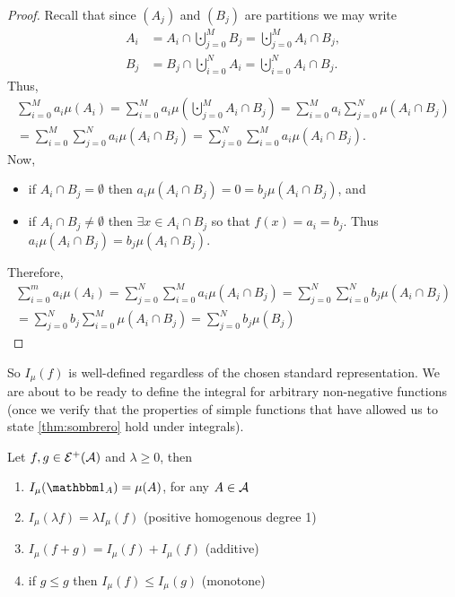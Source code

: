 \begin{proof}
	Recall that since $(A_j)$ and $(B_j)$ are partitions we may write
	\begin{align*}
		A_i &= A_i \cap \bigcupdot_{j = 0}^M B_j = \bigcupdot_{j = 0}^M A_i \cap B_j, \\
		B_j &= B_j \cap \bigcupdot_{i = 0}^N A_i = \bigcupdot_{i = 0}^N A_i \cap B_j.
	\end{align*}
	Thus,
	\begin{multline*}
		\sum_{i = 0}^M a_i \mu(A_i)
		= \sum_{i = 0}^M a_i \mu\left(\bigcupdot_{j = 0}^M A_i \cap B_j\right)
		= \sum_{i = 0}^M a_i \sum_{j = 0}^N \mu(A_i \cap B_j)\\
		= \sum_{i = 0}^M \sum_{j = 0}^N a_i \mu(A_i \cap B_j)
		= \sum_{j = 0}^N \sum_{i = 0}^M a_i \mu(A_i \cap B_j).
	\end{multline*}
	Now,
	\begin{itemize}
		\item if $A_i \cap B_j = \emptyset$ then $a_i\mu(A_i \cap B_j) = 0 = b_j \mu(A_i \cap B_j)$, and
		\item if $A_i \cap B_j \neq \emptyset$ then $\exists x \in A_i \cap B_j$ so that $f(x) = a_i = b_j$. Thus $a_i \mu(A_i \cap B_j) = b_j \mu(A_i \cap B_j)$.
	\end{itemize}
	Therefore,
	\begin{multline*}
		\sum_{i = 0}^m a_i \mu(A_i)
		= \sum_{j = 0}^N \sum_{i = 0}^M a_i \mu(A_i \cap B_j)
		= \sum_{j = 0}^N \sum_{i = 0}^N b_j \mu(A_i \cap B_j)\\
		= \sum_{j = 0}^N b_j \sum_{i = 0}^M \mu(A_i \cap B_j)
		= \sum_{j = 0}^N b_j \mu(B_j)
	\end{multline*}
\end{proof}

So $I_\mu(f)$ is well-defined regardless of the chosen standard representation. We are about to be ready to define the integral for arbitrary non-negative functions (once we verify that the properties of simple functions that have allowed us to state \autoref{thm:sombrero} hold under integrals).

\begin{thm}[Properties of $I_\mu(f)$]
	\label{thm:prop-integrals-simple}
	Let $f, g \in \mathcal{E}^+(\mathcal{A})$ and $\lambda \geq 0$, then
	\begin{enumerate}
		\item $I_\mu(\ind_A) = \mu(A)$, for any $A \in \mathcal{A}$
		\item $I_\mu(\lambda f) = \lambda I_\mu(f)$ (positive homogenous degree 1)
		\item $I_\mu(f + g) = I_\mu(f) + I_\mu(f)$ (additive)
		\item if $g \leq g$ then $I_\mu(f) \leq I_\mu(g)$ (monotone)
	\end{enumerate}	
\end{thm}

